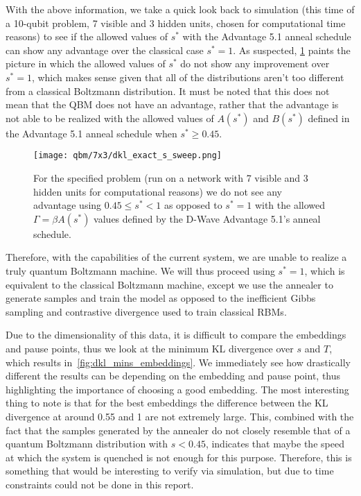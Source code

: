 With the above information, we take a quick look back to simulation (this time of a 10-qubit problem, 7 visible and 3 hidden units, chosen for computational time reasons) to see if the allowed values of \( s^* \) with the Advantage 5.1 anneal schedule can show any advantage over the classical case \( s^* = 1 \).
As suspected, \cref{fig:s_sweep_exact} paints the picture in which the allowed values of \( s^* \) do not show any improvement over \( s^* = 1 \), which makes sense given that all of the distributions aren't too different from a classical Boltzmann distribution.
It must be noted that this does not mean that the QBM does not have an advantage, rather that the advantage is not able to be realized with the allowed values of \( A(s^*) \) and \( B(s^*) \) defined in the Advantage 5.1 anneal schedule when \( s^* \ge 0.45 \).
\begin{figure}[!htb]
    \begin{center}
        \texttt{[image: qbm/7x3/dkl\_exact\_s\_sweep.png]}
    \end{center}
    \caption{For the specified problem (run on a network with 7 visible and 3 hidden units for computational reasons) we do not see any advantage using \( 0.45 \le s^* < 1 \) as opposed to \( s^* = 1 \) with the allowed \( \Gamma = \beta A(s^*) \) values defined by the D-Wave Advantage 5.1's anneal schedule.}
    \label{fig:s_sweep_exact}
\end{figure}

Therefore, with the capabilities of the current system, we are unable to realize a truly quantum Boltzmann machine.
We will thus proceed using \( s^* = 1 \), which is equivalent to the classical Boltzmann machine, except we use the annealer to generate samples and train the model as opposed to the inefficient Gibbs sampling and contrastive divergence used to train classical RBMs.

Due to the dimensionality of this data, it is difficult to compare the embeddings and pause points, thus we look at the minimum KL divergence over \( s \) and \( T \), which results in~\cref{fig:dkl_mins_embeddings}.
We immediately see how drastically different the results can be depending on the embedding and pause point, thus highlighting the importance of choosing a good embedding.
The most interesting thing to note is that for the best embeddings the difference between the KL divergence at around 0.55 and 1 are not extremely large.
This, combined with the fact that the samples generated by the annealer do not closely resemble that of a quantum Boltzmann distribution with \( s < 0.45 \), indicates that maybe the speed at which the system is quenched is not enough for this purpose.
Therefore, this is something that would be interesting to verify via simulation, but due to time constraints could not be done in this report.

